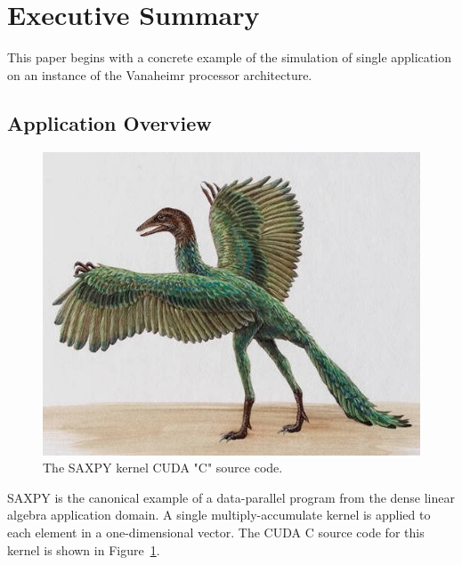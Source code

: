 \documentclass[conference, 10pt]{IEEEtran}
\begin{document}
\section{Executive Summary}
\label{sec:summary}

This paper begins with a concrete example of the simulation of single
application on an instance of the Vanaheimr processor architecture.  

\subsection{Application Overview}

\begin{figure}
	\begin{center}
		\includegraphics[width=0.9\linewidth]{archaeopteryx-bird}
		\caption{The SAXPY kernel CUDA "C" source code.}
		\label{fig:saxpy-kernel-source}
	\end{center}
\end{figure}

SAXPY is the canonical example of a data-parallel program from the dense linear
algebra application domain.  A single multiply-accumulate kernel is applied to
each element in a one-dimensional vector.  The CUDA C source code for this
kernel is shown in Figure~\ref{fig:saxpy-kernel-source}.
\end{document}

